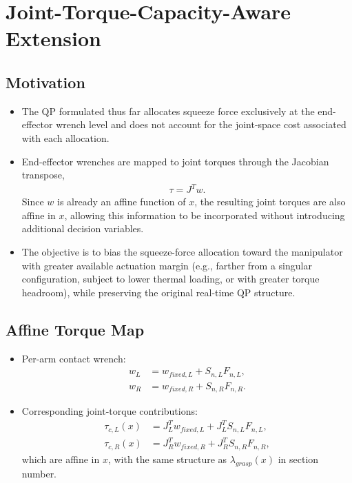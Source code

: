 \documentclass[conference]{IEEEtran}
\begin{document}
\section*{Joint-Torque-Capacity-Aware Extension}

\subsection*{Motivation}

\begin{itemize}
    \item The QP formulated thus far allocates squeeze force exclusively at the end-effector wrench level and does not account for the joint-space cost associated with each allocation.

    \item End-effector wrenches are mapped to joint torques through the Jacobian transpose,
    \begin{align}
        \tau
        =
        J^{T}w.
    \end{align}
    Since \(w\) is already an affine function of \(x\), the resulting joint torques are also affine in \(x\), allowing this information to be incorporated without introducing additional decision variables.

    \item The objective is to bias the squeeze-force allocation toward the manipulator with greater available actuation margin (e.g., farther from a singular configuration, subject to lower thermal loading, or with greater torque headroom), while preserving the original real-time QP structure.
\end{itemize}

\subsection*{Affine Torque Map}
\begin{itemize}
    \item Per-arm contact wrench:
    \[
    \begin{aligned}
    w_L &= w_{fixed,L} + S_{n,L}F_{n,L},\\
    w_R &= w_{fixed,R} + S_{n,R}F_{n,R}.
    \end{aligned}
    \]

    \item Corresponding joint-torque contributions:
    \[
    \begin{aligned}
    \tau_{c,L}(x) &= J_L^T w_{fixed,L} + J_L^T S_{n,L}F_{n,L},\\
    \tau_{c,R}(x) &= J_R^T w_{fixed,R} + J_R^T S_{n,R}F_{n,R},
    \end{aligned}
    \]
    which are affine in \(x\), with the same structure as \(\lambda_{grasp}(x)\) in section number.
\end{itemize}
\end{document}
